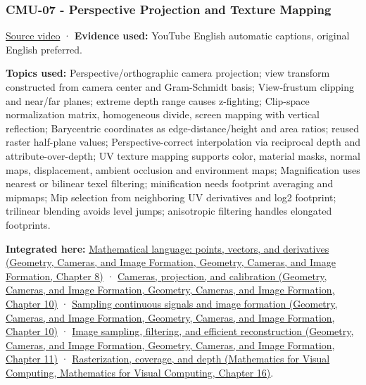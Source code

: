 \subsubsection{CMU-07 - Perspective Projection and Texture Mapping}\label{04-visual-computing-ii-ch036-cmu-07---perspective-projection-and-texture-mapping}

\href{https://www.youtube.com/watch?v=_4Q4O2Kgdo4}{Source video} · \textbf{Evidence used:} YouTube English automatic captions, original English preferred.

\textbf{Topics used:} Perspective/orthographic camera projection; view transform constructed from camera center and Gram-Schmidt basis; View-frustum clipping and near/far planes; extreme depth range causes z-fighting; Clip-space normalization matrix, homogeneous divide, screen mapping with vertical reflection; Barycentric coordinates as edge-distance/height and area ratios; reused raster half-plane values; Perspective-correct interpolation via reciprocal depth and attribute-over-depth; UV texture mapping supports color, material masks, normal maps, displacement, ambient occlusion and environment maps; Magnification uses nearest or bilinear texel filtering; minification needs footprint averaging and mipmaps; Mip selection from neighboring UV derivatives and log2 footprint; trilinear blending avoids level jumps; anisotropic filtering handles elongated footprints.

\textbf{Integrated here:} \href{../03-Geometry-Cameras-and-Image-Formation/main.pdf\#nameddest=03-visual-computing-i-ch001-mathematical-language-points-vectors-and-derivatives}{Mathematical language: points, vectors, and derivatives (Geometry, Cameras, and Image Formation, Geometry, Cameras, and Image Formation, Chapter 8)} · \href{../03-Geometry-Cameras-and-Image-Formation/main.pdf\#nameddest=03-visual-computing-i-ch003-cameras-projection-and-calibration}{Cameras, projection, and calibration (Geometry, Cameras, and Image Formation, Geometry, Cameras, and Image Formation, Chapter 10)} · \href{../03-Geometry-Cameras-and-Image-Formation/main.pdf\#nameddest=03-visual-computing-i-ch003-sampling-continuous-signals-and-image-formation}{Sampling continuous signals and image formation (Geometry, Cameras, and Image Formation, Geometry, Cameras, and Image Formation, Chapter 10)} · \href{../03-Geometry-Cameras-and-Image-Formation/main.pdf\#nameddest=03-visual-computing-i-ch004-image-sampling-filtering-and-efficient-reconstruction}{Image sampling, filtering, and efficient reconstruction (Geometry, Cameras, and Image Formation, Geometry, Cameras, and Image Formation, Chapter 11)} · \href{../02-Mathematics-for-Visual-Computing/main.pdf\#nameddest=03-visual-computing-i-ch012-rasterization-coverage-and-depth}{Rasterization, coverage, and depth (Mathematics for Visual Computing, Mathematics for Visual Computing, Chapter 16)}.

